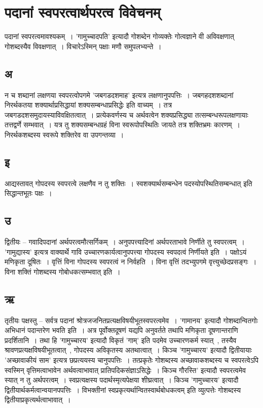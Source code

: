 	\section{पदानां स्वपरत्वार्थपरत्व विवेचनम्}

		पदानां स्वपरत्वमावश्यकम्~। ’गामुच्चादपति’ इत्यादौ  गोशब्देन गोव्यक्तेः गोत्वज्ञाने वी अविवक्षणात् गोशब्दस्यैव विवक्षणात्~। विचारेऽस्मिन् पक्षाः मणौ समुपलभ्यन्ते~।
			
		\subsection{अ}	
		
			न च शब्दानां लक्षणया स्वपरत्वोपगमे ’जबगडदशमाह’ इत्यत्र लक्षणानुपपत्तिः~। जबगहदशशब्दानां निरर्थकतया शक्यार्थाप्रसिद्धायां शक्यसम्बन्धाप्रसिद्धेः इति वाच्यम्~। तत्र जबगडदशसमुदायस्याविवक्षितत्वात्~। प्रत्येकवर्णस्य च अर्थवत्वेन शक्यप्रसिद्ध्या तत्सम्बन्धरूपलक्षणायाः तत्तद्वर्णे सम्भवात्~। यत्र तु शक्यसम्बन्धग्रहं विना स्वरूपोपस्थितिः जायते तत्र शक्तिभ्रमः कारणम्~। निरर्थकशब्दस्य स्वरूपे शक्तिरेव वा उपगन्तव्या~।
			 
		\subsection{इ}
		
			आद्यस्तावत् गोपदस्य स्वपरत्वे लक्षणैव न तु शक्तिः~। स्वशक्यार्थसम्बन्धेन  पदस्योपस्थितिसम्बन्धात् इति सिद्धान्तभूतः पक्षः~। 

		\subsection{उ}
		
			द्वितीयः – गवादिपदानां अर्थपरत्वमौत्सर्गिकम्~। अनुपपत्त्यादिनां अर्थपरताभावे निर्णीते तु स्वपरत्वम्~। ’गामुद्यास्य’ इत्यत्र वाक्यार्थे गावि उच्चारणकार्यत्वानुपपत्त्या गोपदस्य स्वपदत्वं निर्णीयते इति~। पक्षोऽयं मणिकृता दूषितः~। वृत्तिं विना गोपदस्य स्वपरत्वं न निर्वहति~। विना वृत्तिं तदभ्युपगमे वृत्त्युच्छेदप्रसङ्गः~। विना शक्तिं गोशब्दस्य गोबोधकत्सम्भवात् इति~।	

		\subsection{ऋ}
		
			तृतीयः पक्षस्तु – सर्वत्र पदानां श्रोत्रजजनितप्रत्यक्षविषयीभूतस्वपरत्वमेव~। ’गामानय’ इत्यादौ गोशब्दान्वितगोः अभिधानं पदान्तरेण भवति इति~। अत्र पूर्वोक्तदूषणं यद्यपि अनुवर्तते तथापि मणिकृता दूषणान्तराणि प्रदर्शितानि~। तथा हि ’गामुच्चारय’ इत्यादौ विकृतं ’गाम्’ इति पदमेव उच्चारणकर्म स्यात्~, तस्यैव श्रावणप्रत्यक्षविषयीभूतत्वात्~, गोपदस्य अविकृतस्य अतथात्वात्~। किञ्च ’गामुच्चारय’ इत्यादौ द्वितीयायाः ’अच्छावाकीयं साम’ इत्यत्र छप्रत्ययस्य चानुपपत्तिः~। तत्प्रकृतेः गोशब्दस्य अच्छावाकशब्दस्य च स्वपरत्वेऽपि  स्वस्मिन् वृत्तिमत्वाभावेन अर्थवत्वाभावात् प्रातिपदिकसंज्ञाऽसिद्धेः~। किञ्च गौरस्ति’ इत्यादौ स्वपरत्वमेव स्यात् न तु अर्थपरत्वम्~। स्वप्रत्यक्षस्य पदार्थस्मृत्यपेक्षया शीघ्रत्वात्~। किञ्च ’गामुच्चारय’ इत्यादौ द्वितीयार्थकर्मत्वान्वयानपपत्तिः~। विभक्तीनां स्वप्रकृत्यर्थान्वितस्वार्थबोधकत्वम् इति व्युत्पत्तेः गोशब्दस्य द्वितीयाप्रकृत्यर्थत्वाभावात्~।

